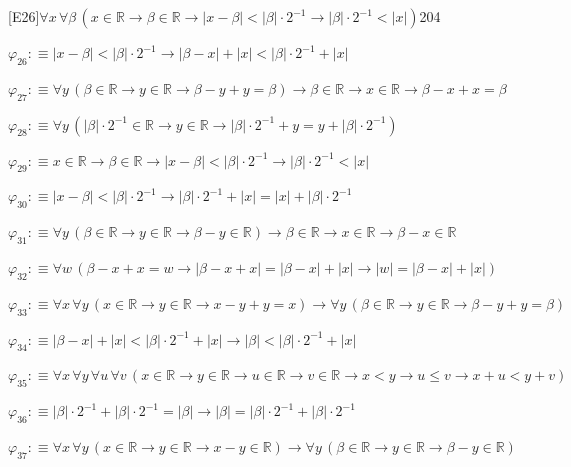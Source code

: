 \begin{fullproof}{[E26]}{$\forall x\,\forall \beta\,(x \in \mathbb{R} \to \beta \in \mathbb{R} \to \lvert x - \beta \rvert < \lvert \beta \rvert \cdot 2^{-1} \to \lvert \beta \rvert \cdot 2^{-1} < \lvert x \rvert)$}{204}
\begin{abbrevlist}
\item $\varphi_{26} :\equiv \lvert x - \beta \rvert < \lvert \beta \rvert \cdot 2^{-1} \to \lvert \beta - x \rvert + \lvert x \rvert < \lvert \beta \rvert \cdot 2^{-1} + \lvert x \rvert$
\item $\varphi_{27} :\equiv \forall y\,(\beta \in \mathbb{R} \to y \in \mathbb{R} \to \beta - y + y = \beta) \to \beta \in \mathbb{R} \to x \in \mathbb{R} \to \beta - x + x = \beta$
\item $\varphi_{28} :\equiv \forall y\,(\lvert \beta \rvert \cdot 2^{-1} \in \mathbb{R} \to y \in \mathbb{R} \to \lvert \beta \rvert \cdot 2^{-1} + y = y + \lvert \beta \rvert \cdot 2^{-1})$
\item $\varphi_{29} :\equiv x \in \mathbb{R} \to \beta \in \mathbb{R} \to \lvert x - \beta \rvert < \lvert \beta \rvert \cdot 2^{-1} \to \lvert \beta \rvert \cdot 2^{-1} < \lvert x \rvert$
\item $\varphi_{30} :\equiv \lvert x - \beta \rvert < \lvert \beta \rvert \cdot 2^{-1} \to \lvert \beta \rvert \cdot 2^{-1} + \lvert x \rvert = \lvert x \rvert + \lvert \beta \rvert \cdot 2^{-1}$
\item $\varphi_{31} :\equiv \forall y\,(\beta \in \mathbb{R} \to y \in \mathbb{R} \to \beta - y \in \mathbb{R}) \to \beta \in \mathbb{R} \to x \in \mathbb{R} \to \beta - x \in \mathbb{R}$
\item $\varphi_{32} :\equiv \forall w\,(\beta - x + x = w \to \lvert \beta - x + x \rvert = \lvert \beta - x \rvert + \lvert x \rvert \to \lvert w \rvert = \lvert \beta - x \rvert + \lvert x \rvert)$
\item $\varphi_{33} :\equiv \forall x\,\forall y\,(x \in \mathbb{R} \to y \in \mathbb{R} \to x - y + y = x) \to \forall y\,(\beta \in \mathbb{R} \to y \in \mathbb{R} \to \beta - y + y = \beta)$
\item $\varphi_{34} :\equiv \lvert \beta - x \rvert + \lvert x \rvert < \lvert \beta \rvert \cdot 2^{-1} + \lvert x \rvert \to \lvert \beta \rvert < \lvert \beta \rvert \cdot 2^{-1} + \lvert x \rvert$
\item $\varphi_{35} :\equiv \forall x\,\forall y\,\forall u\,\forall v\,(x \in \mathbb{R} \to y \in \mathbb{R} \to u \in \mathbb{R} \to v \in \mathbb{R} \to x < y \to u \leq v \to x + u < y + v)$
\item $\varphi_{36} :\equiv \lvert \beta \rvert \cdot 2^{-1} + \lvert \beta \rvert \cdot 2^{-1} = \lvert \beta \rvert \to \lvert \beta \rvert = \lvert \beta \rvert \cdot 2^{-1} + \lvert \beta \rvert \cdot 2^{-1}$
\item $\varphi_{37} :\equiv \forall x\,\forall y\,(x \in \mathbb{R} \to y \in \mathbb{R} \to x - y \in \mathbb{R}) \to \forall y\,(\beta \in \mathbb{R} \to y \in \mathbb{R} \to \beta - y \in \mathbb{R})$

\end{abbrevlist}
\end{fullproof}
